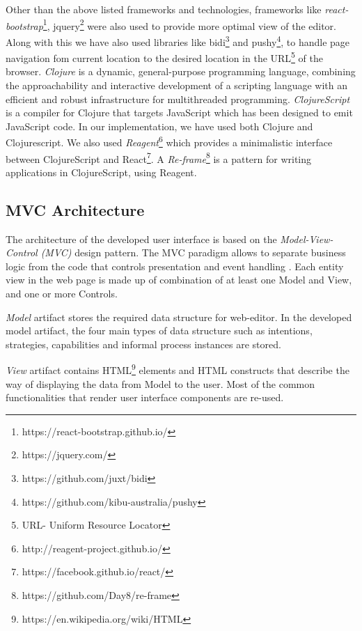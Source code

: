 Other than the above listed frameworks and technologies, frameworks like \textit{react-bootstrap}\footnote{https://react-bootstrap.github.io/}, jquery\footnote{https://jquery.com/} were also used to provide more optimal view of the editor. Along with this we have also used libraries like bidi\footnote{https://github.com/juxt/bidi} and pushy\footnote{https://github.com/kibu-australia/pushy}, to handle page navigation fom current location to the desired location in the URL\footnote{URL- Uniform Resource Locator} of the browser. \textit{Clojure} is a dynamic, general-purpose programming language, combining the approachability and interactive development of a scripting language with an efficient and robust infrastructure for multithreaded programming. \textit{ClojureScript} is a compiler for Clojure that targets JavaScript which has been designed to emit JavaScript code. In our implementation, we have used both Clojure and Clojurescript. We also used \textit{Reagent}\footnote{http://reagent-project.github.io/} which provides a minimalistic interface between ClojureScript and React\footnote{https://facebook.github.io/react/}. A \textit{Re-frame}\footnote{https://github.com/Day8/re-frame} is a pattern for writing applications in ClojureScript, using Reagent.

\subsection{MVC Architecture}
\label{subsec:mvcarch}
The architecture of the developed user interface is based on the \textit{Model-View-Control (MVC)} design pattern. The MVC paradigm allows to separate business logic from the code that controls presentation and event handling \cite{Oracle2016}. Each entity view in the web page is made up of combination of at least one Model and View, and one or more Controls. 

\textit{Model} artifact stores the required data structure for web-editor. In the developed model artifact, the four main types of data structure such as intentions, strategies, capabilities and informal process instances are stored. 

\textit{View} artifact contains HTML\footnote{https://en.wikipedia.org/wiki/HTML} elements and HTML constructs that describe the way of displaying the data from Model to the user. Most of the common functionalities that render user interface components are re-used. 

